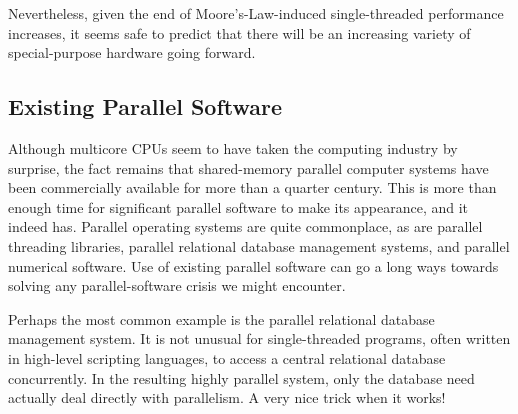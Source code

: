 Nevertheless, given the end of Moore's-Law-induced single-threaded
performance increases, it seems safe to predict that there will
be an increasing variety of special-purpose hardware going forward.

\subsection{Existing Parallel Software}
\label{sec:cpu:Existing Parallel Software}

Although multicore CPUs seem to have taken the computing industry
by surprise, the fact remains that shared-memory parallel computer
systems have been commercially available for more than a quarter
century.
This is more than enough time for significant parallel software
to make its appearance, and it indeed has.
Parallel operating systems are quite commonplace, as are parallel
threading libraries, parallel relational database management systems, 
and parallel numerical software.
Use of existing parallel software can go a long ways towards solving any
parallel-software crisis we might encounter.

Perhaps the most common example is the parallel relational database
management system.
It is not unusual for single-threaded programs, often written in
high-level scripting languages, to access a central relational
database concurrently.
In the resulting highly parallel system, only the database need actually
deal directly with parallelism.
A very nice trick when it works!
